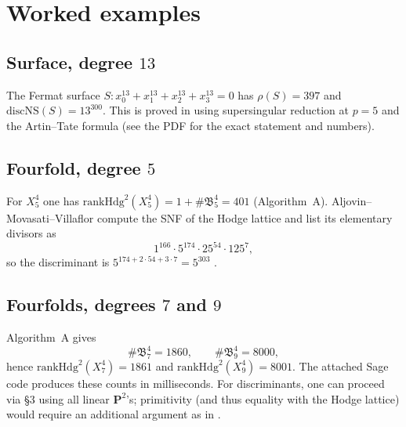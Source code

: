 \documentclass[11pt]{article}
\theoremstyle{definition}
\newcommand{\PP}{\mathbf{P}}
\newcommand{\Hdg}{\mathrm{Hdg}}
\newcommand{\NS}{\mathrm{NS}}
\newcommand{\rank}{\mathrm{rank}}
\newcommand{\disc}{\mathrm{disc}}
\begin{document}
\section{Worked examples}
\subsection*{Surface, degree \(13\)}
The Fermat surface \(S: x_0^{13}+x_1^{13}+x_2^{13}+x_3^{13}=0\) has \(\rho(S)=397\) and \(\disc \NS(S)=13^{300}\). This is proved in \cite[\S6.5]{SchuettShiodaVanLuijk2009} using supersingular reduction at \(p=5\) and the Artin--Tate formula (see the PDF for the exact statement and numbers).

\subsection*{Fourfold, degree \(5\)}
For \(X_5^4\) one has \(\rank \Hdg^2(X_5^4)=1+\#\mathfrak B_5^4=401\) (Algorithm~A). Aljovin--Movasati--Villaflor compute the SNF of the Hodge lattice and list its elementary divisors as
\[
1^{166}\cdot 5^{174}\cdot 25^{54}\cdot 125^{7},
\]
so the discriminant is \(5^{174+2\cdot 54+3\cdot 7}=5^{303}\) \cite[Table~1, row $(n,d)=(4,5)$]{AMV2019}.

\subsection*{Fourfolds, degrees \(7\) and \(9\)}
Algorithm~A gives
\[
\#\mathfrak B_7^4=1860,\qquad \#\mathfrak B_9^4=8000,
\]
hence \(\rank \Hdg^2(X_7^4)=1861\) and \(\rank \Hdg^2(X_9^4)=8001\). The attached \textsf{Sage} code produces these counts in milliseconds. For discriminants, one can proceed via \S3 using all linear \(\PP^2\)'s; primitivity (and thus equality with the Hodge lattice) would require an additional argument as in \cite{AMV2019}.
\end{document}
